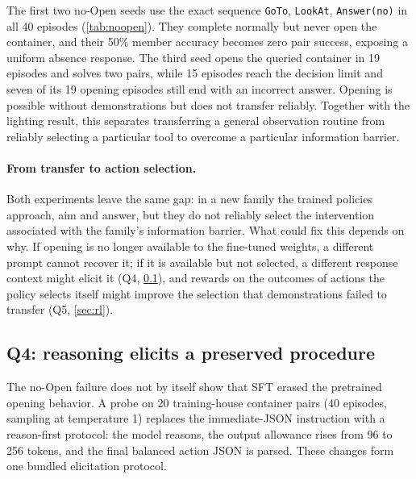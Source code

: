 \documentclass{article}
\begin{document}
The first two no-Open seeds use the exact sequence \texttt{GoTo}, \texttt{LookAt}, \texttt{Answer(no)} in all 40 episodes (\cref{tab:noopen}). They complete normally but never open the container, and their 50\% member accuracy becomes zero pair success, exposing a uniform absence response. The third seed opens the queried container in 19 episodes and solves two pairs, while 15 episodes reach the decision limit and seven of its 19 opening episodes still end with an incorrect answer. Opening is possible without demonstrations but does not transfer reliably. Together with the lighting result, this separates transferring a general observation routine from reliably selecting a particular tool to overcome a particular information barrier.

\paragraph{From transfer to action selection.} Both experiments leave the same gap: in a new family the trained policies approach, aim and answer, but they do not reliably select the intervention associated with the family's information barrier. What could fix this depends on why. If opening is no longer available to the fine-tuned weights, a different prompt cannot recover it; if it is available but not selected, a different response context might elicit it (Q4, \cref{sec:reason}), and rewards on the outcomes of actions the policy selects itself might improve the selection that demonstrations failed to transfer (Q5, \cref{sec:rl}).

\subsection{Q4: reasoning elicits a preserved procedure}
\label{sec:reason}
The no-Open failure does not by itself show that SFT erased the pretrained opening behavior. A probe on 20 training-house container pairs (40 episodes, sampling at temperature 1) replaces the immediate-JSON instruction with a reason-first protocol: the model reasons, the output allowance rises from 96 to 256 tokens, and the final balanced action JSON is parsed. These changes form one bundled elicitation protocol.
\end{document}
